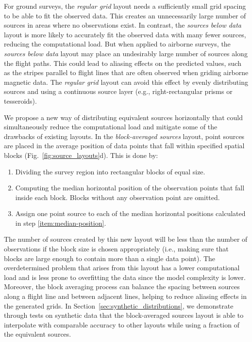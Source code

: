 For ground surveys, the \emph{regular grid} layout needs a sufficiently
small grid spacing to be able to fit the observed data.
This creates an unnecessarily large number of sources in areas where no
observations exist.
In contrast, the \emph{sources below data} layout is more likely to accurately
fit the observed data with many fewer sources, reducing the computational load.
But when applied to airborne surveys, the \emph{sources below data} layout may
place an undesirably large number of sources along the flight paths.
This could lead to aliasing effects on the predicted values, such as the
stripes parallel to flight lines that are often observed when griding airborne
magnetic data.
The \emph{regular grid} layout can avoid this effect by evenly
distributing sources and using a continuous source layer (e.g.,
right-rectangular prisms or tesseroids).

We propose a new way of distributing equivalent sources horizontally that could
simultaneously reduce the computational load and mitigate some of the drawbacks
of existing layouts.
In the \emph{block-averaged sources} layout,
point sources are placed in the average
position of data points that fall within specified spatial blocks
(Fig.~\ref{fig:source_layouts}d).
This is done by:

\begin{enumerate}
    \item Dividing the survey region into rectangular blocks of equal size.
    \item \label{item:median-position} Computing the median horizontal position
        of the observation points that fall inside each block. Blocks without
        any observation point are omitted.
    \item Assign one point source to each of the median horizontal positions
      calculated in step \ref{item:median-position}.
\end{enumerate}

The number of sources created by this new layout will be less than the number
of observations if the block size is chosen appropriately (i.e., making sure
that blocks are large enough to contain more than a single data point).
The overdetermined problem that arises from this layout has a lower
computational load and is less prone to overfitting the data since the model
complexity is lower.
Moreover, the block averaging process can balance the spacing between sources
along a flight line and between adjacent lines, helping to reduce aliasing
effects in the generated grids.
In Section~\ref{sec:synthetic_distributions}, we demonstrate through tests on
synthetic data that the block-averaged sources layout is able to interpolate
with comparable accuracy to other layouts while using a fraction of the
equivalent sources.


